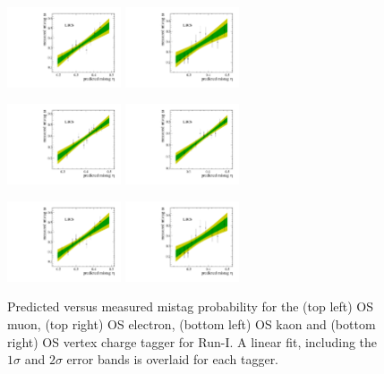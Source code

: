 \begin{figure}[hp]
\centering
\includegraphics[height=!,width=0.3\textwidth]{figs/Tagging/Run1/OS_Muon_Calibration.pdf}
\includegraphics[height=!,width=0.3\textwidth]{figs/Tagging/Run1/OS_Electron_Calibration.pdf}

\includegraphics[height=!,width=0.3\textwidth]{figs/Tagging/Run1/OS_nnetKaon_Calibration.pdf}
\includegraphics[height=!,width=0.3\textwidth]{figs/Tagging/Run1/VtxCharge_Calibration.pdf}
\caption{\small Predicted versus measured mistag probability for the (top left) OS muon, (top right) OS electron, (bottom left) OS kaon and (bottom right) OS vertex charge tagger for Run-I. 
A linear fit, including the $1\sigma$ and $2\sigma$ error bands is overlaid for each tagger.}
\label{fig:OSdistribution_Run1}
%
\centering
\includegraphics[height=!,width=0.3\textwidth]{figs/Tagging/Run2/OS_Muon_Calibration.pdf}
\includegraphics[height=!,width=0.3\textwidth]{figs/Tagging/Run2/OS_Electron_Calibration.pdf}


\end{figure}
